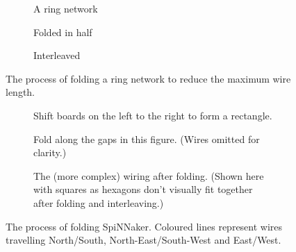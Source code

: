 			\begin{figure}
				\begin{subfigure}[b]{\textwidth}
					\center
					
					\caption{A ring network}
					\label{fig:ringLong}
				\end{subfigure}
				
				\vspace{2ex}
				
				\begin{subfigure}[b]{\textwidth}
					\center
					
					\caption{Folded in half}
					\label{fig:ringFolded}
				\end{subfigure}
				
				\vspace{2ex}
				
				\begin{subfigure}[b]{\textwidth}
					\center
					
					\caption{Interleaved}
					\label{fig:ringInterleaved}
				\end{subfigure}
				
				\caption[Folding a ring network.]{The process of folding a ring network
				to reduce the maximum wire length.}
				\label{fig:folding}
			\end{figure}
			
			\begin{figure}
				\center
				\begin{subfigure}[b]{\textwidth}
					\center
					
					\caption{Shift boards on the left to the right to form a rectangle.}
					\label{fig:boardsFoldedShift}
				\end{subfigure}
				
				\vspace{2ex}
				
				\begin{subfigure}[b]{\textwidth}
					\center
					
					\caption{Fold along the gaps in this figure. (Wires omitted for
					clarity.)}
					\label{fig:boardsFoldedSpaced}
				\end{subfigure}
				
				\vspace{2ex}
				
				\begin{subfigure}[b]{\textwidth}
					\center
					
					\caption{The (more complex) wiring after folding. (Shown here with
					squares as hexagons don't visually fit together after folding and
					interleaving.)}
					\label{fig:boardsFoldedInterleaved}
				\end{subfigure}
				
				\caption[Folding SpiNNaker.]{The process of folding SpiNNaker. Coloured
				lines represent wires travelling {\color{red}North/South},
				{\color{green}North-East/South-West} and {\color{blue}East/West}.}
				\label{fig:boardsFolded}
			\end{figure}
			
